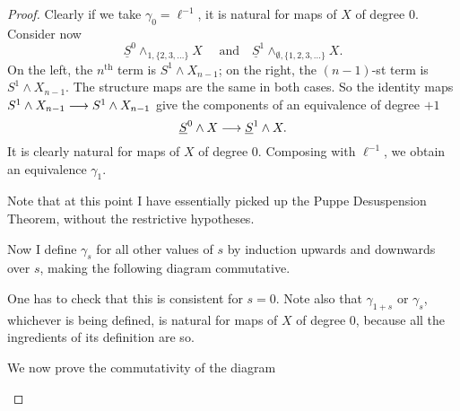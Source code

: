 \documentclass[../main]{subfiles}
\begin{document}
\begin{proof}
Clearly if we take $\gamma_0 = \ell^{-1}$, it is natural for maps of $X$ of degree $0$. Consider now $$\underline S^0 \wedge_{1, \{2, 3, \ldots\}} X \quad \text { and} \quad \underline S^1 \wedge_{\emptyset, \{1, 2, 3, \ldots\}} X.$$ On the left, the $n^{\mathrm{th}}$ term is $S^1 \wedge X_{n - 1}$; on the right, the $(n - 1)$-st term is $S^1 \wedge X_{n - 1}$. The structure maps are the same in both cases. So the identity maps $S^1 \wedge X_{n - 1} \overset{}{\longrightarrow} S^1 \wedge X_{n - 1}$ give the components of an equivalence of degree $+1$ $$\underline S^0 \wedge X \overset{}{\longrightarrow} \underline S^1 \wedge X.$$ It is clearly natural for maps of $X$ of degree $0$. Composing with $\ell^{-1}$, we obtain an equivalence $\gamma_1$. 

Note that at this point I have essentially picked up the Puppe Desuspension Theorem, without the restrictive hypotheses.

Now I define $\gamma_s$ for all other values of $s$ by induction upwards and downwards over $s$, making the following diagram commutative. 

\begin{center}
\end{center}

One has to check that this is consistent for $s = 0$. Note also that $\gamma_{1 + s}$ or $\gamma_s$, whichever is being defined, is natural for maps of $X$ of degree $0$, because all the ingredients of its definition are so. 

We now prove the commutativity of the diagram

\begin{center}
\end{center}


\end{proof}
\end{document}
